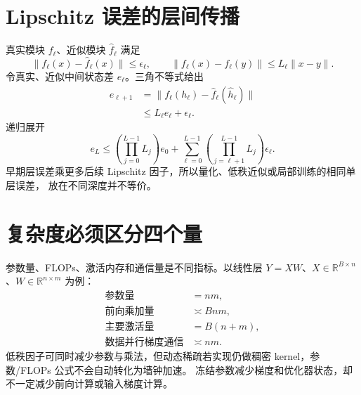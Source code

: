 \documentclass[11pt]{article}
\numberwithin{equation}{section}
\newcommand{\R}{\mathbb{R}}
\newcommand{\1}{\mathbf{1}}
\begin{document}
\section{Lipschitz 误差的层间传播}

真实模块 $f_\ell$、近似模块 $\widehat f_\ell$ 满足
\begin{equation}
 \|f_\ell(x)-\widehat f_\ell(x)\|\le\epsilon_\ell,
 \qquad
 \|f_\ell(x)-f_\ell(y)\|\le L_\ell\|x-y\|.
\end{equation}
令真实、近似中间状态差 $e_\ell$。三角不等式给出
\begin{align}
 e_{\ell+1}
 &=\|f_\ell(h_\ell)-\widehat f_\ell(\widehat h_\ell)\|\\
 &\le L_\ell e_\ell+\epsilon_\ell.
\end{align}
递归展开
\begin{equation}
 e_L\le
 \left(\prod_{j=0}^{L-1}L_j\right)e_0
 +\sum_{\ell=0}^{L-1}
 \left(\prod_{j=\ell+1}^{L-1}L_j\right)\epsilon_\ell.
\end{equation}
早期层误差乘更多后续 Lipschitz 因子，所以量化、低秩近似或局部训练的相同单层误差，
放在不同深度并不等价。

\section{复杂度必须区分四个量}

参数量、FLOPs、激活内存和通信量是不同指标。以线性层
$Y=XW$、$X\in\R^{B\times n}$、$W\in\R^{n\times m}$ 为例：
\begin{align}
 \text{参数量}&=nm,\\
 \text{前向乘加量}&\asymp Bnm,\\
 \text{主要激活量}&=B(n+m),\\
 \text{数据并行梯度通信}&\asymp nm.
\end{align}
低秩因子可同时减少参数与乘法，但动态稀疏若实现仍做稠密 kernel，参数/FLOPs 公式不会自动转化为墙钟加速。
冻结参数减少梯度和优化器状态，却不一定减少前向计算或输入梯度计算。
\end{document}
